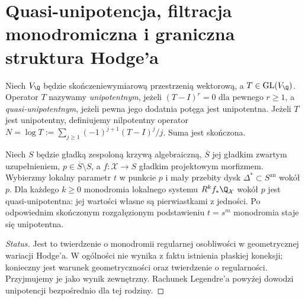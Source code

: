 \section{Quasi-unipotencja, filtracja monodromiczna i graniczna struktura Hodge'a}
\begin{definicja}
Niech $V_\Q$ będzie skończeniewymiarową przestrzenią
wektorową, a $T\in\operatorname{GL}(V_\Q)$.
Operator $T$ nazywamy \emph{unipotentnym}, jeżeli
$(T-I)^r=0$ dla pewnego $r\ge1$, a \emph{quasi-unipotentnym},
jeżeli pewna jego dodatnia potęga jest unipotentna.
Jeżeli $T$ jest unipotentny, definiujemy nilpotentny
operator $N=\log T:=\sum_{j\ge1}(-1)^{j+1}(T-I)^j/j$.
Suma jest skończona.
\end{definicja}
\begin{twierdzenie}
Niech $S$ będzie gładką zespoloną krzywą algebraiczną,
$\overline S$ jej gładkim zwartym uzupełnieniem,
$p\in\overline S\setminus S$, a
$f:\mathcal X\to S$ gładkim projektowym morfizmem.
Wybierzmy lokalny parametr $t$ w punkcie $p$
i mały przebity dysk $\Delta^*\subset S^{\mathrm{an}}$
wokół $p$. Dla każdego $k\ge0$ monodromia lokalnego
systemu $R^kf_*\Q_{\mathcal X}$ wokół $p$
jest quasi-unipotentna: jej wartości własne
są pierwiastkami z jedności. Po odpowiednim
skończonym rozgałęzionym podstawieniu $t=s^m$
monodromia staje się unipotentna.
\end{twierdzenie}
\begin{proof}[Status]
Jest to twierdzenie o monodromii regularnej osobliwości
w geometrycznej wariacji Hodge'a. W ogólności nie wynika
z faktu istnienia płaskiej koneksji; konieczny jest warunek
geometryczności oraz twierdzenie o regularności.
Przyjmujemy je jako wynik zewnętrzny. Rachunek Legendre'a
powyżej dowodzi unipotencji bezpośrednio dla tej rodziny.
\end{proof}

